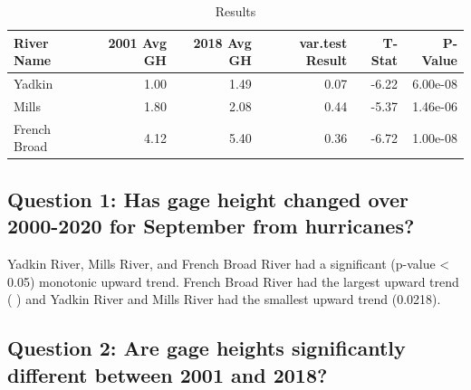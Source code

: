 \documentclass[
  12pt,
]{article}
\begin{document}
\begin{table}

\caption{\label{tab:T-Test}Results}
\centering
\begin{tabular}[t]{|>{}l|||>{}r|||>{}r|||>{}r|||>{}r||r}
\hline
River Name & 2001 Avg GH & 2018 Avg GH & var.test Result & T-Stat & P-Value\\
\hline
Yadkin & 1.00 & 1.49 & 0.07 & -6.22 & 6.00e-08\\
\hline
Mills & 1.80 & 2.08 & 0.44 & -5.37 & 1.46e-06\\
\hline
French Broad & 4.12 & 5.40 & 0.36 & -6.72 & 1.00e-08\\
\hline
\end{tabular}
\end{table}

\hypertarget{question-1-has-gage-height-changed-over-2000-2020-for-september-from-hurricanes}{%
\subsection{Question 1: Has gage height changed over 2000-2020 for
September from
hurricanes?}\label{question-1-has-gage-height-changed-over-2000-2020-for-september-from-hurricanes}}

Yadkin River, Mills River, and French Broad River had a significant
(p-value \textless{} 0.05) monotonic upward trend. French Broad River
had the largest upward trend ( ) and Yadkin River and Mills River had
the smallest upward trend (0.0218).

\hypertarget{question-2-are-gage-heights-significantly-different-between-2001-and-2018}{%
\subsection{Question 2: Are gage heights significantly different between
2001 and
2018?}\label{question-2-are-gage-heights-significantly-different-between-2001-and-2018}}
\end{document}
